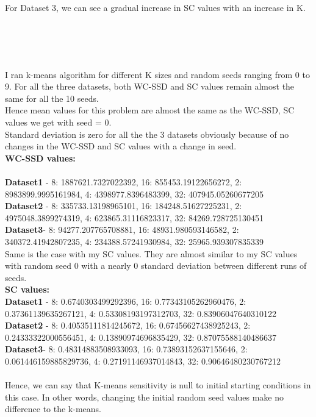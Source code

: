 \documentclass[11pt]{article}
\begin{document}
For Dataset 3, we can see a gradual increase in SC values with an
increase in K.\\
\subsubsection{}
    \begin{center}
    \end{center}
    { \hspace*{\fill} \\}

 \begin{center}
    \end{center}
    { \hspace*{\fill} \\}

    I ran k-means algorithm for different K sizes and random seeds ranging
from 0 to 9. For all the three datasets, both WC-SSD and SC values
remain almost the same for all the 10 seeds. \\Hence mean values for this problem
are almost the same as the WC-SSD, SC values we get with seed = 0. \\
Standard deviation is zero for all the the 3 datasets obviously because
of no changes in the WC-SSD and SC values with a change in seed.\\
\textbf{WC-SSD values: }\\
\\
\textbf{Dataset1 }- 8: 1887621.7327022392, 16: 855453.19122656272, 2: 8983899.9995161984, 4: 4398977.8396483399, 32: 407945.05260677205\\
\textbf{Dataset2 }- 8: 335733.13198965101, 16: 184248.51627225231, 2: 4975048.3899274319, 4: 623865.31116823317, 32: 84269.728725130451\\
\textbf{Dataset3}-  8: 94277.207765708881, 16: 48931.980593146582, 2: 340372.41942807235, 4: 234388.57241930984, 32: 25965.939307835339\\

Same is the case with my SC values. They are almost similar to my SC values with random seed 0 with a nearly 0 standard deviation between different runs of seeds.\\
\textbf{SC values: }\\
 \textbf{Dataset1} - 8: 0.6740303499292396, 16: 0.77343105262960476, 2: 0.37361139635267121, 4: 0.53308193197312703, 32: 0.83906047640310122\\
\textbf{Dataset2} - 8: 0.40535111814245672, 16: 0.67456627438925243, 2: 0.24333322000556451, 4: 0.13890974696835429, 32: 0.87075588140486637\\
\textbf{Dataset3}- 8: 0.48314883508933093, 16: 0.73893152637155646, 2: 0.061446159885829736, 4: 0.27191146937014843, 32: 0.90646480230767212\\
\\
Hence, we can say that K-means sensitivity is null to initial starting
conditions in this case. In other words, changing the initial random
seed values make no difference to the k-means.\\
\end{document}
